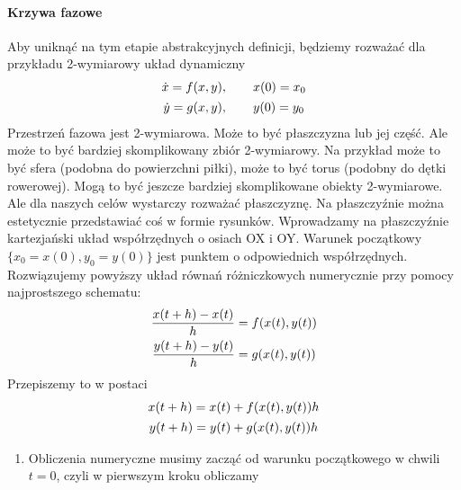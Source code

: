 \documentclass[a4paper,12pt,polish]{sphinxmanual}
\begin{document}
\paragraph{Krzywa fazowe}
\label{ch1/chI021:krzywa-fazowe}
Aby uniknąć na tym etapie abstrakcyjnych definicji, będziemy rozważać dla przykładu 2-wymiarowy układ dynamiczny
\label{ch1/chI021:equation-eqn33}\begin{gather}
\begin{split} \dot x = f(x, y), \quad \quad x(0) = x_0\end{split}\label{ch1/chI021-eqn33}\\\begin{split} \dot y= g(x, y),\quad \quad y(0) = y_0\end{split}\notag
\end{gather}
Przestrzeń fazowa jest 2-wymiarowa. Może to być płaszczyzna lub jej część. Ale może to być bardziej skomplikowany zbiór 2-wymiarowy. Na przykład może to być sfera (podobna do  powierzchni piłki), może to być torus (podobny do dętki rowerowej). Mogą to być jeszcze bardziej skomplikowane obiekty 2-wymiarowe. Ale dla naszych celów wystarczy rozważać płaszczyznę. Na płaszczyźnie można estetycznie przedstawiać coś w formie rysunków. Wprowadzamy na płaszczyźnie kartezjański układ współrzędnych o osiach OX i OY. Warunek początkowy $\{x_0=x(0), y_0=y(0)\}$ jest punktem o odpowiednich współrzędnych. Rozwiązujemy powyższy układ równań różniczkowych numerycznie przy pomocy najprostszego schematu:
\label{ch1/chI021:equation-eqn35}\begin{gather}
\begin{split}\frac{x(t+h) - x(t)}{h} = f(x(t), y(t))\end{split}\label{ch1/chI021-eqn35}\\\begin{split}\frac{y(t+h) - y(t)}{h} = g(x(t), y(t))\end{split}\notag
\end{gather}
Przepiszemy to w postaci
\label{ch1/chI021:equation-eqn37}\begin{gather}
\begin{split}x(t+h) = x(t) + f(x(t), y(t)) h\end{split}\label{ch1/chI021-eqn37}\\\begin{split}y(t+h) = y(t) + g(x(t), y(t)) h\end{split}\notag
\end{gather}\begin{enumerate}
\item {} 
Obliczenia numeryczne musimy zacząć od warunku początkowego w chwili $t=0$, czyli w pierwszym kroku obliczamy

\end{enumerate}
\end{document}
